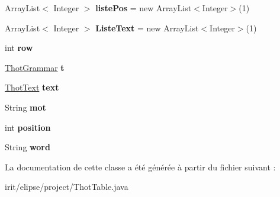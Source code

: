 \begin{DoxyCompactItemize}
Array\+List$<$ Integer $>$ {\bfseries liste\+Pos} = new Array\+List$<$Integer$>$(1)
\item 
\mbox{\label{classfr_1_1irit_1_1elipse_1_1project_1_1_thot_table_a4d98d15584d111981a02737676924368}} 
Array\+List$<$ Integer $>$ {\bfseries Liste\+Text} = new Array\+List$<$Integer$>$(1)
\item 
\mbox{\label{classfr_1_1irit_1_1elipse_1_1project_1_1_thot_table_ac5a726f578ff2bf9da9465b26faae608}} 
int {\bfseries row}
\item 
\mbox{\label{classfr_1_1irit_1_1elipse_1_1project_1_1_thot_table_a04a226c17c8745182ca8bdd25afa9eda}} 
\mbox{\hyperlink{classfr_1_1irit_1_1elipse_1_1project_1_1_thot_grammar}{Thot\+Grammar}} {\bfseries t}
\item 
\mbox{\label{classfr_1_1irit_1_1elipse_1_1project_1_1_thot_table_a09eaa59e08c44c3af584e2661f09d1a2}} 
\mbox{\hyperlink{classfr_1_1irit_1_1elipse_1_1project_1_1_thot_text}{Thot\+Text}} {\bfseries text}
\item 
\mbox{\label{classfr_1_1irit_1_1elipse_1_1project_1_1_thot_table_a2673244d998124b9193348809c5402fc}} 
String {\bfseries mot}
\item 
\mbox{\label{classfr_1_1irit_1_1elipse_1_1project_1_1_thot_table_a0f8dfd48629e2e9e80e0a7c52343bedf}} 
int {\bfseries position}
\item 
\mbox{\label{classfr_1_1irit_1_1elipse_1_1project_1_1_thot_table_ae04272dc3f0a9840175a8fe31e70c26e}} 
String {\bfseries word}
\end{DoxyCompactItemize}


La documentation de cette classe a été générée à partir du fichier suivant \+:\begin{DoxyCompactItemize}
\item 
irit/elipse/project/Thot\+Table.\+java\end{DoxyCompactItemize}
